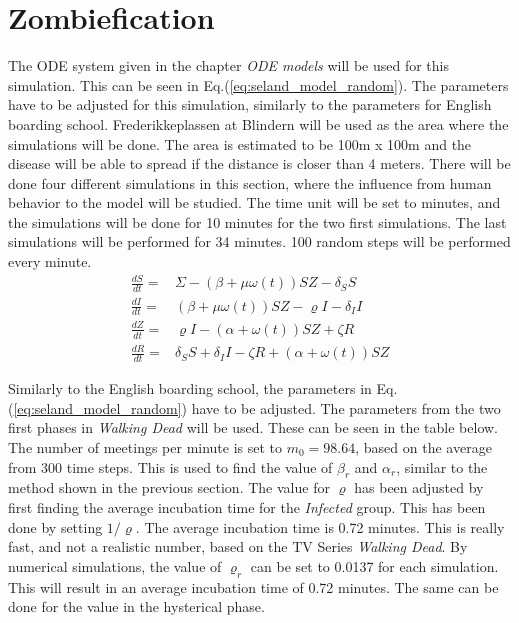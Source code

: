 \documentclass[%
twoside,                 %
final,                   %
chapterprefix=true,      %
open=right               %
10pt]{book}
\begin{document}


\section{Zombiefication}
The ODE system given in the chapter \emph{ODE models} will be used for this simulation. This can be seen in Eq.(\ref{eq:seland_model_random}). The parameters have to be adjusted for this simulation, similarly to the parameters for English boarding school. Frederikkeplassen at Blindern will be used as the area where the simulations will be done. The area is estimated to be 100m x 100m and the disease will be able to spread if the distance is closer than 4 meters. There will be done four different simulations in this section, where the influence from human behavior to the model will be studied. The time unit will be set to minutes, and the simulations will be done for 10 minutes for the two first simulations. The last simulations will be performed for 34 minutes. 100 random steps will be performed every minute.       
\begin{equation} \label{eq:seland_model_random}
    \begin{aligned} 
    \frac{dS}{dt} =& \Sigma -(\beta+\mu \omega(t))SZ - \delta_SS \\
    \frac{dI}{dt} =& (\beta+\mu \omega(t))SZ - \varrho I - \delta_II\\
    \frac{dZ}{dt} =& \varrho I- (\alpha+\omega(t))SZ + \zeta R\\
    \frac{dR}{dt} =& \delta_SS +\delta_II -\zeta R + (\alpha+\omega(t))SZ 
    \end{aligned}
\end{equation}

Similarly to the English boarding school, the parameters in Eq.(\ref{eq:seland_model_random}) have to be adjusted. The parameters from the two first phases in \emph{Walking Dead} will be used. These can be seen in the table below. The number of meetings per minute is set to $m_0 = 98.64$, based on the average from 300 time steps. This is used to find the value of $\beta_r$ and $\alpha_r$, similar to the method shown in the previous section. The value for $\varrho$ has been adjusted by first finding the average incubation time for the \emph{Infected} group. This has been done by setting $1/\varrho$. The average incubation time is 0.72 minutes. This is really fast, and not a realistic number, based on the TV Series \emph{Walking Dead}. By numerical simulations, the value of $\varrho_r$ can be set to 0.0137 for each simulation. This will result in an average incubation time of 0.72 minutes. The same can be done for the value in the hysterical phase.  
\end{document}
